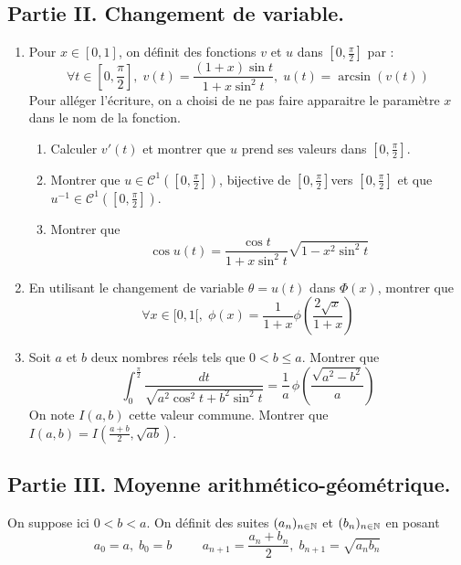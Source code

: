 \subsection*{Partie II. Changement de variable.}
\begin{enumerate}
\item  Pour $x\in [0,1]$, on définit des fonctions $v$ et $u$ dans $\left[ 0,\frac{\pi }{2}\right]$ par :
\begin{displaymath}
\forall t\in \left[ 0,\frac{\pi }{2}\right],\; v(t) = \frac{(1+x)\sin t}{1+x\sin ^{2}t},\; u(t)=\arcsin \left( v(t)\right)
\end{displaymath}
Pour alléger l'écriture, on a choisi de ne pas faire apparaitre le paramètre $x$ dans le nom de la fonction.
\begin{enumerate}
\item  Calculer $v'(t)$ et montrer que $u$ prend ses valeurs dans $\left[ 0,\frac{\pi }{2}\right]$.

\item  Montrer que $u\in \mathcal{C}^{1}(\left[ 0,\frac{\pi }{2}\right])$, bijective de $\left[ 0,\frac{\pi }{2}\right] $vers $\left[ 0,\frac{\pi }{2}\right]$ et que $u^{-1}\in \mathcal{C}^{1}(\left[ 0,\frac{\pi }{2}\right])$.

\item  Montrer que 
\begin{displaymath}
\cos u(t) = \frac{\cos t}{1+x\sin ^{2}t}\sqrt{1-x^{2}\sin ^{2}t}
\end{displaymath}
\end{enumerate}

\item  En utilisant le changement de variable $\theta = u(t)$ dans $\Phi(x)$, montrer que
\begin{displaymath}
\forall x \in [0,1[,\; \phi (x) = \frac{1}{1+x}\phi (\frac{2\sqrt{x}}{1+x})
\end{displaymath}

\item  Soit $a$ et $b$ deux nombres r{\'e}els tels que $0<b\leq a$. Montrer que
\begin{displaymath}
  \int_{0}^{\frac{\pi }{2}}\frac{dt}{\sqrt{a^{2}\cos ^{2}t+b^{2}\sin^{2}t}}=
  \frac{1}{a}\, \phi (\frac{\sqrt{a^{2}-b^{2}}}{a})
\end{displaymath}
On note $I(a,b)$ cette valeur commune. Montrer que $I(a,b)=I(\frac{a+b}{2},\sqrt{ab})$.
\end{enumerate}

\subsection*{Partie III. Moyenne arithmético-géométrique.}
On suppose ici $0<b<a$. On d{\'e}finit des suites $(a_{n})_{n\in \mathbb{N}}$ et $(b_{n})_{n\in \mathbb{N}}$ en posant
\begin{displaymath}
a_{0} =a,\; b_{0}=b \hspace{1cm}
a_{n+1} = \frac{a_{n}+b_{n}}{2}, \;b_{n+1}=\sqrt{a_{n}b_{n}}
\end{displaymath}

